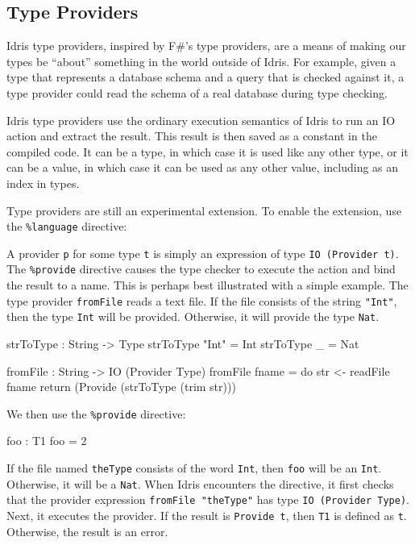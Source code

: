\subsection{Type Providers}

Idris type providers, inspired by F\#'s type providers, are a means of making our types be ``about'' something in the world outside of Idris.
For example, given a type that represents a database schema and a query that is checked against it, a type provider could read the schema of a real database during type checking.

Idris type providers use the ordinary execution semantics of Idris to run an IO action and extract the result.
This result is then saved as a constant in the compiled code.
It can be a type, in which case it is used like any other type, or it can be a value, in which case it can be used as any other value, including as an index in types.

Type providers are still an experimental extension. To enable the extension, use the \texttt{\%language} directive:

\begin{code}
\end{code}

A provider \texttt{p} for some type \texttt{t} is simply an expression of type \texttt{IO (Provider t)}.
The \texttt{\%provide} directive causes the type checker to execute the action and bind the result to a name.
This is perhaps best illustrated with a simple example.
The type provider \texttt{fromFile} reads a text file.
If the file consists of the string \texttt{"Int"}, then the type \texttt{Int} will be provided.
Otherwise, it will provide the type \texttt{Nat}.

\begin{code}
strToType : String -> Type
strToType "Int" = Int
strToType _ = Nat

fromFile : String -> IO (Provider Type)
fromFile fname = do str <- readFile fname
                    return (Provide (strToType (trim str)))
\end{code}

We then use the \texttt{\%provide} directive:

\begin{code}

foo : T1
foo = 2
\end{code}

\noindent
If the file named \texttt{theType} consists of the word \texttt{Int}, then \texttt{foo} will be an \texttt{Int}.
Otherwise, it will be a \texttt{Nat}.
When Idris encounters the directive, it first checks that the provider expression \texttt{fromFile "theType"} has type \texttt{IO (Provider Type)}.
Next, it executes the provider. If the result is \texttt{Provide t}, then \texttt{T1} is defined as \texttt{t}. 
Otherwise, the result is an error.

